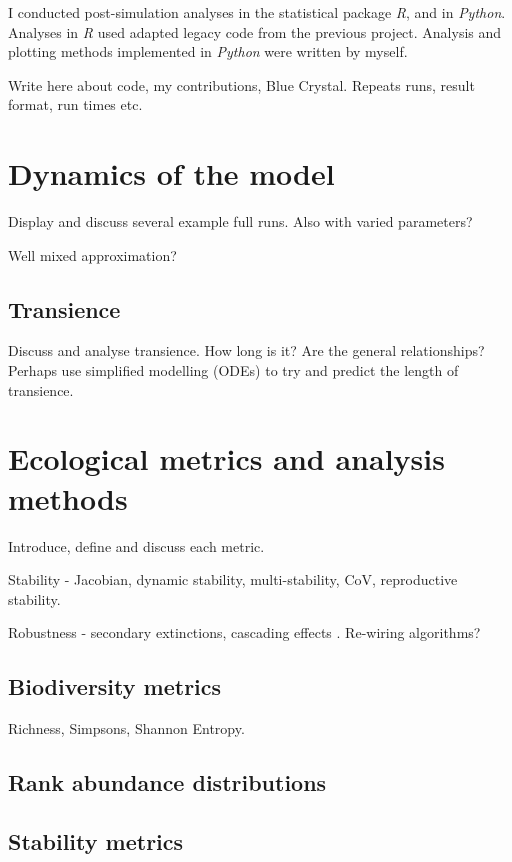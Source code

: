 I conducted post-simulation analyses in the statistical package \emph{R}, and in \emph{Python}. Analyses in \emph{R} used adapted legacy code from the previous project. Analysis and plotting methods implemented in \emph{Python} were written by myself.

Write here about code, my contributions, Blue Crystal. Repeats runs, result format, run times etc.

\section{Dynamics of the model}
\label{sec:dynamics_results}

Display and discuss several example full runs. Also with varied parameters?

Well mixed approximation?

\subsection{Transience}

Discuss and analyse transience. How long is it? Are the general relationships? Perhaps use simplified modelling (ODEs) to try and predict the length of transience.


\section{Ecological metrics and analysis methods}
\label{sec:metrics_explained}

Introduce, define and discuss each metric.

Stability - Jacobian, dynamic stability, multi-stability, CoV, reproductive stability. 

Robustness - secondary extinctions, cascading effects \cite{evans2013robustness}. Re-wiring algorithms?

\subsection{Biodiversity metrics}
\label{sec:define_dviersity}
Richness, Simpsons, Shannon Entropy.

\subsection{Rank abundance distributions}
\label{sec:def_RADs}


\subsection{Stability metrics}
\label{sec:def_stability_metrics}

